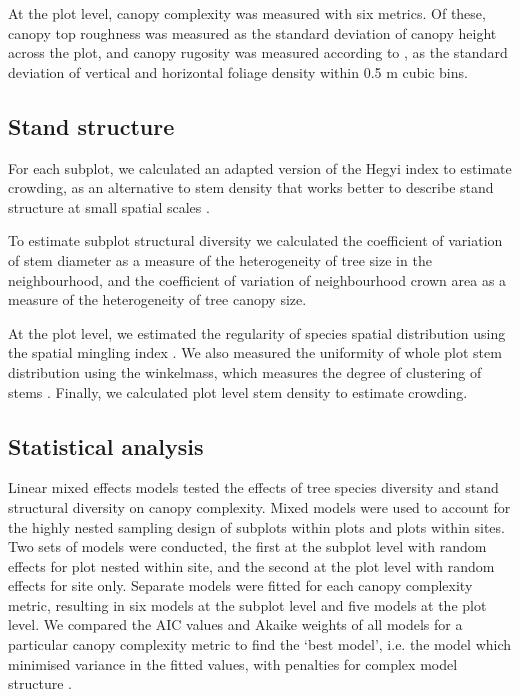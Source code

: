 \documentclass[11pt,a4paper]{article}
\begin{document}
At the plot level, canopy complexity was measured with six metrics. Of these, canopy top roughness was measured as the standard deviation of canopy height across the plot, and canopy rugosity was measured according to \citet{Hardiman2011}, as the standard deviation of vertical and horizontal foliage density within 0.5 m cubic bins.

\subsection{Stand structure}

For each subplot, we calculated an adapted version of the Hegyi index to estimate crowding, as an alternative to stem density that works better to describe stand structure at small spatial scales \citep{Hegyi1974}. 

To estimate subplot structural diversity we calculated the coefficient of variation of stem diameter as a measure of the heterogeneity of tree size in the neighbourhood, and the coefficient of variation of neighbourhood crown area as a measure of the heterogeneity of tree canopy size.

At the plot level, we estimated the regularity of species spatial distribution using the spatial mingling index \citep{Gadow2002}. We also measured the uniformity of whole plot stem distribution using the winkelmass, which measures the degree of clustering of stems \citep{Gadow2002}. Finally, we calculated plot level stem density to estimate crowding.

\subsection{Statistical analysis}

Linear mixed effects models tested the effects of tree species diversity and stand structural diversity on canopy complexity. Mixed models were used to account for the highly nested sampling design of subplots within plots and plots within sites. Two sets of models were conducted, the first at the subplot level with random effects for plot nested within site, and the second at the plot level with random effects for site only. Separate models were fitted for each canopy complexity metric, resulting in six models at the subplot level and five models at the plot level. We compared the AIC values and Akaike weights of all models for a particular canopy complexity metric to find the `best model', i.e. the model which minimised variance in the fitted values, with penalties for complex model structure \citep{Akaike1992}.
\end{document}
